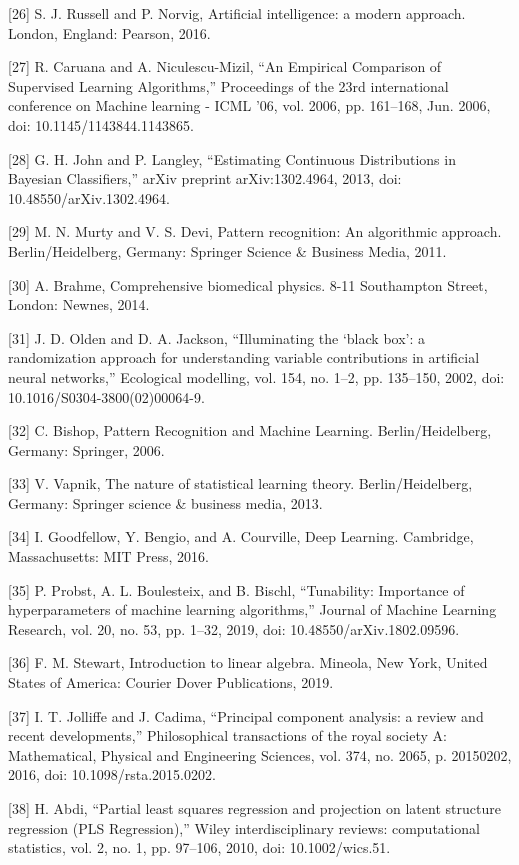 \let\LaTeXcline\cline\documentclass[sn-mathphys-num]{sn-jnl}\let\cline\LaTeXcline
\begin{document}
[26] S. J. Russell and P. Norvig, Artificial intelligence: a modern approach. London, England: Pearson, 2016.

[27] R. Caruana and A. Niculescu-Mizil, “An Empirical Comparison of Supervised Learning Algorithms,” Proceedings of the 23rd international conference on Machine learning - ICML ’06, vol. 2006, pp. 161–168, Jun. 2006, doi: 10.1145/1143844.1143865.

[28] G. H. John and P. Langley, “Estimating Continuous Distributions in Bayesian Classifiers,” arXiv preprint arXiv:1302.4964, 2013, doi: 10.48550/arXiv.1302.4964.

[29] M. N. Murty and V. S. Devi, Pattern recognition: An algorithmic approach. Berlin/Heidelberg, Germany: Springer Science & Business Media, 2011.

[30] A. Brahme, Comprehensive biomedical physics. 8-11 Southampton Street, London: Newnes, 2014.

[31] J. D. Olden and D. A. Jackson, “Illuminating the ‘black box’: a randomization approach for understanding variable contributions in artificial neural networks,” Ecological modelling, vol. 154, no. 1–2, pp. 135–150, 2002, doi: 10.1016/S0304-3800(02)00064-9.

[32] C. Bishop, Pattern Recognition and Machine Learning. Berlin/Heidelberg, Germany: Springer, 2006.

[33] V. Vapnik, The nature of statistical learning theory. Berlin/Heidelberg, Germany: Springer science & business media, 2013.

[34] I. Goodfellow, Y. Bengio, and A. Courville, Deep Learning. Cambridge, Massachusetts: MIT Press, 2016.

[35] P. Probst, A. L. Boulesteix, and B. Bischl, “Tunability: Importance of hyperparameters of machine learning algorithms,” Journal of Machine Learning Research, vol. 20, no. 53, pp. 1–32, 2019, doi: 10.48550/arXiv.1802.09596.

[36] F. M. Stewart, Introduction to linear algebra. Mineola, New York, United States of America: Courier Dover Publications, 2019.

[37] I. T. Jolliffe and J. Cadima, “Principal component analysis: a review and recent developments,” Philosophical transactions of the royal society A: Mathematical, Physical and Engineering Sciences, vol. 374, no. 2065, p. 20150202, 2016, doi: 10.1098/rsta.2015.0202.

[38] H. Abdi, “Partial least squares regression and projection on latent structure regression (PLS Regression),” Wiley interdisciplinary reviews: computational statistics, vol. 2, no. 1, pp. 97–106, 2010, doi: 10.1002/wics.51.
\end{document}
